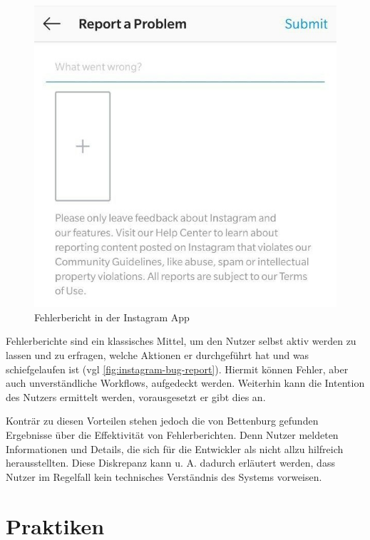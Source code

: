 \begin{figure}
\centering
\vspace{-\baselineskip}
\includegraphics[width=\linewidth]{img/instagram-feedback/instagram-feedback.jpg}
\caption{Fehlerbericht in der Instagram App \cite{Instagram}}
\label{fig:instagram-bug-report}
\end{figure}

Fehlerberichte sind ein klassisches Mittel, um den Nutzer selbst aktiv werden zu lassen und zu erfragen, welche Aktionen er durchgeführt hat und was schiefgelaufen ist (vgl \autoref{fig:instagram-bug-report}). Hiermit können Fehler, aber auch unverständliche Workflows, aufgedeckt werden. Weiterhin kann die Intention des Nutzers ermittelt werden, vorausgesetzt er gibt dies an.

Konträr zu diesen Vorteilen stehen jedoch die von Bettenburg \etal \cite{WhatMakesAGoodBugReport} gefunden Ergebnisse über die Effektivität von Fehlerberichten. Denn Nutzer meldeten Informationen und Details, die sich für die Entwickler als nicht allzu hilfreich herausstellten. Diese Diskrepanz kann u. A. dadurch erläutert werden, dass Nutzer im Regelfall kein technisches Verständnis des Systems vorweisen.

\section{Praktiken}

